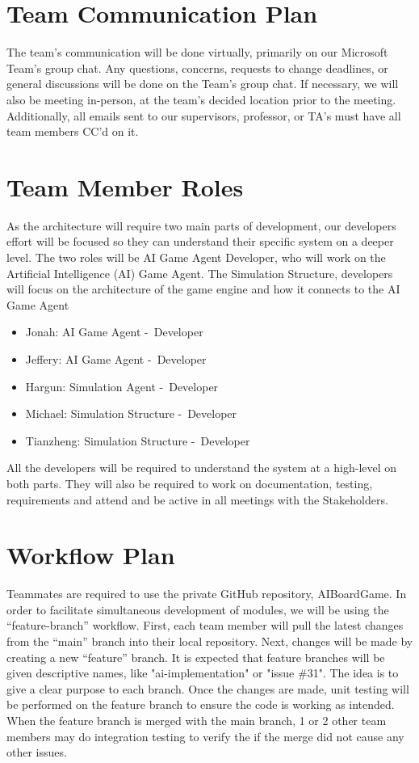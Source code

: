 \documentclass{article}
\begin{document}
\section{Team Communication Plan}
The team’s communication will be done virtually, primarily on our Microsoft Team’s group chat. Any questions, concerns, requests to change deadlines, or general discussions will be done on the Team’s group chat. If necessary, we will also be meeting in-person, at the team’s decided location prior to the meeting. 
Additionally, all emails sent to our supervisors, professor, or TA’s must have all team members CC’d on it.
\section{Team Member Roles}
As the architecture will require two main parts of development, our developers effort will be focused so they can understand their specific system on a deeper level.
The two roles will be AI Game Agent Developer, who will work on the Artificial Intelligence (AI) Game Agent. The Simulation Structure, developers will focus on the architecture of the game engine and how it connects to the AI Game Agent
\begin{itemize}
	\item Jonah: AI Game Agent -\ Developer
	\item Jeffery: AI Game Agent -\ Developer
	\item Hargun: Simulation Agent -\ Developer
	\item Michael: Simulation Structure -\ Developer
	\item Tianzheng: Simulation Structure -\ Developer
\end{itemize}
All the developers will be required to understand the system at a high-level on both parts. They will also be required to work on documentation, testing, requirements and attend and be active in all meetings with the Stakeholders.
\section{Workflow Plan}
Teammates are required to use the private GitHub repository, AIBoardGame. 
In order to facilitate simultaneous development of modules, we will be using the “feature-branch” workflow. First, each team member will pull the latest changes from the “main” branch into their local repository. 
Next, changes will be made by creating a new “feature” branch. It is expected that feature branches will be given descriptive names, like "ai-implementation" or "issue \#31". The idea is to give a clear purpose to each branch. 
Once the changes are made, unit testing will be performed on the feature branch to ensure the code is working as intended. 
When the feature branch is merged with the main branch, 1 or 2 other team members may do integration testing to verify the if the merge did not cause any other issues. 
\end{document}
